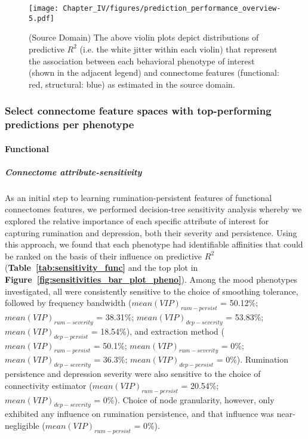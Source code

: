 \documentclass[
  notitlepage]{article}
\begin{document}
\begin{figure}
\centering
\texttt{[image: Chapter\_IV/figures/prediction\_performance\_overview-5.pdf]}
\caption{(Source Domain) \label{fig:prediction_performance_overview}\scriptsize{The above violin plots depict distributions of predictive $R^2$ (i.e. the white jitter within each violin) that represent the association between each behavioral phenotype of interest (shown in the adjacent legend) and connectome features (functional: red, structural: blue) as estimated in the source domain.}}
\end{figure}
\setlength{\belowcaptionskip}{-10pt}

\hypertarget{select-connectome-feature-spaces-with-top-performing-predictions-per-phenotype}{%
\subsubsection{Select connectome feature spaces with top-performing
predictions per
phenotype}\label{select-connectome-feature-spaces-with-top-performing-predictions-per-phenotype}}
\hypertarget{functional}{%
\paragraph{Functional}\label{functional}}
\hypertarget{connectome-attribute-sensitivity}{%
\subparagraph{Connectome
attribute-sensitivity}\label{connectome-attribute-sensitivity}}
As an initial step to learning rumination-persistent features of functional connectomes features, we performed decision-tree sensitivity
analysis whereby we explored the relative importance of each specific
attribute of interest for capturing rumination and depression, both
their severity and persistence. Using this approach, we found that each
phenotype had identifiable affinities that could be ranked on the basis
of their influence on predictive \(R^{2}\) (\textbf{Table~\ref{tab:sensitivity_func}} and the top plot in \textbf{Figure~\ref{fig:sensitivities_bar_plot_pheno}}). Among the mood phenotypes investigated, all were consistently sensitive to the choice of smoothing
tolerance, followed by frequency bandwidth
(\(mean(VIP)_{rum-persist}\) = 50.12\%; \(mean(VIP)_{rum-severity}\) = 38.31\%; \(mean(VIP)_{dep-severity}\) = 53.83\%; \(mean(VIP)_{dep-persist}\) = 18.54\%), and extraction method (\(mean(VIP)_{rum-persist}\) = 50.1\%; \(mean(VIP)_{rum-severity}\) = 0\%; \(mean(VIP)_{dep-severity}\) = 36.3\%;
\(mean(VIP)_{dep-persist}\) = 0\%). Rumination persistence and
depression severity were also sensitive to the choice of connectivity
estimator (\(mean(VIP)_{rum-persist}\) = 20.54\%;
\(mean(VIP)_{dep-severity}\) = 0\%). Choice of node granularity, however,
only exhibited any influence on rumination persistence, and that
influence was near-negligible (\(mean(VIP)_{rum-persist}\) = 0\%).
\end{document}
